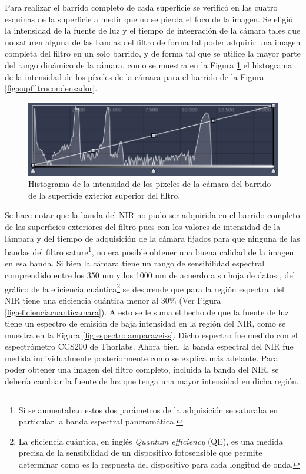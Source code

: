 \documentclass{ctuthesis}
\begin{document}
Para realizar el barrido completo de cada superficie se verificó en las cuatro esquinas de la superficie a medir que no se pierda el foco de la imagen. Se eligió la intensidad de la fuente de luz y el tiempo de integración de la cámara tales que no saturen alguna de las bandas del filtro de forma tal poder adquirir una imagen completa del filtro en un solo barrido, y de forma tal que se utilice la mayor parte del rango dinámico de la cámara, como se muestra en la Figura \ref{fig:histograma15x15} el histograma de la intensidad de los píxeles de la cámara para el barrido de la Figura \ref{fig:supfiltrocondensador}.

\begin{figure}[!h]
	\centering
	\includegraphics[width=1.0\textwidth]{Figs/defectosZEISS/histograma15x15.png}
	\caption{Histograma de la intensidad de los píxeles de la cámara del barrido de la superficie exterior superior del filtro.}
	\label{fig:histograma15x15}
\end{figure} 

Se hace notar que la banda del NIR no pudo ser adquirida en el barrido completo de las superficies exteriores del filtro pues con los valores de intensidad de la lámpara y del tiempo de adquisición de la cámara fijados para que ninguna de las bandas del filtro sature\footnote{Si se aumentaban estos dos parámetros de la adquisición se saturaba en particular la banda espectral pancromática.}, no era posible obtener una buena calidad de la imagen en esa banda. Si bien la cámara tiene un rango de sensibilidad espectral comprendido entre los 350 nm y los 1000 nm de acuerdo a su hoja de datos \cite{Zeiss}, del gráfico de la eficiencia cuántica\footnote{La eficiencia cuántica, en inglés \textit{Quantum efficiency} (QE), es una medida precisa de la sensibilidad de un dispositivo fotosensible que permite determinar como es la respuesta del dispositivo para cada longitud de onda.} se desprende que para la región espectral del NIR tiene una eficiencia cuántica menor al 30\% (Ver Figura \ref{fig:eficienciacuanticamara}). A esto se le suma el hecho de que la fuente de luz tiene un espectro de emisión de baja intensidad en la región del NIR, como se muestra en la Figura \ref{fig:espectrolamparazeiss}. Dicho espectro fue medido con el espectrómetro CCS200 de Thorlabs. Ahora bien, la banda espectral del NIR fue medida individualmente posteriormente como se explica más adelante.
Para poder obtener una imagen del filtro completo, incluida la banda del NIR, se debería cambiar la fuente de luz que tenga una mayor intensidad en dicha región.
\end{document}
